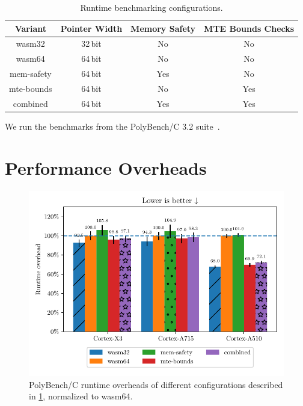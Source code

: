 \begin{table}[ht]
    \centering
    \small
    \begin{tabular}{c || c|c|c}
        \textbf{Variant} & \textbf{Pointer Width} & \textbf{Memory Safety} & \textbf{MTE Bounds Checks} \\
        \hline
        wasm32           & 32\,bit                & No                     & No                         \\
        wasm64           & 64\,bit                & No                     & No                         \\
        mem-safety       & 64\,bit                & Yes                    & No                         \\
        mte-bounds       & 64\,bit                & No                     & Yes                        \\
        combined         & 64\,bit                & Yes                    & Yes                        \\
    \end{tabular}
    \caption{Runtime benchmarking configurations.}
    \label{tab:benchmark-variants}
\end{table}

\noindent
We run the benchmarks from the PolyBench/C 3.2 suite~\cite{polybenchc}.


\section{Performance Overheads}
\label{sec:performance-overheads}

\begin{figure}[ht]
    \centering
    \includegraphics{plots/runtimes-all}
    \caption{PolyBench/C runtime overheads of different configurations described in \cref{tab:benchmark-variants}, normalized to wasm64.}
    \label{fig:runtime-overheads-combined}
\end{figure}

